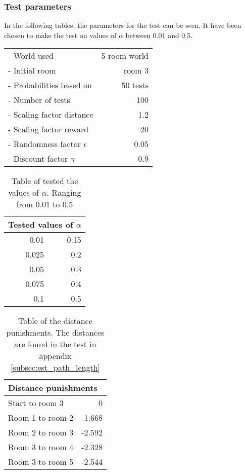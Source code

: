 \documentclass[../Head/Main.tex]{subfiles}
\begin{document}
\subsubsection*{Test parameters}
In the following tables, the parameters for the test can be seen. It have been chosen to make the test on values of $\alpha$ between 0.01 and 0.5.\\
\begin{minipage}[c]{0.35\textwidth}
	\begin{tabular}{l r}
	- World used                   & 5-room world\\
	- Initial room                 & room 3\\	
	- Probabilities based on       & 50 tests\\	
	- Number of tests              & 100\\
	- Scaling factor distance      & 1.2\\
	- Scaling factor reward        & 20\\
	- Randomness factor $\epsilon$ & 0.05\\
	- Discount factor $\gamma$     & 0.9\\
	\end{tabular}
\end{minipage}	
\hfill
\begin{minipage}[c]{0.2\textwidth}
	\begin{table}[H]
		\centering
		\begin{tabular}{r r}
		\hline
		\multicolumn{2}{l}{\textbf{Tested values of $\alpha$}}\\ 			\hline
		0.01   & 0.15\\
		0.025  & 0.2\\
		0.05   & 0.3\\
		0.075  & 0.4\\
		0.1    & 0.5\\
		\hline
		\end{tabular}
		\caption{Table of tested the values of $\alpha$. Ranging from 0.01 to 0.5}
		\label{tab:test_alpha}
	\end{table}
\end{minipage}
\hfill
\begin{minipage}[c]{0.3\textwidth}
	\begin{table}[H]
	\centering
	\begin{tabular}{l r}
		\hline
		\multicolumn{2}{l}{\textbf{Distance punishments}}\\ 			\hline
		Start to room 3   & 0\\
		Room 1 to room 2  & -1.668\\
		Room 2 to room 3  & -2.592\\
		Room 3 to room 4  & -2.328\\
		Room 3 to room 5  & -2.544\\
		\hline
	\end{tabular}
	\caption{Table of the distance punishments. The distances are found in the test in appendix \ref{subsec:est_path_length}}
	\label{tab:distance_punishment_5_rooms_1}
\end{table}
\end{minipage}
\end{document}
